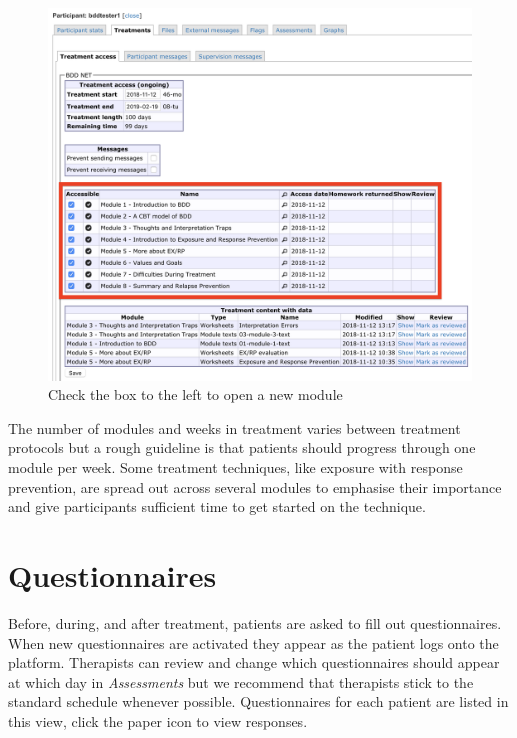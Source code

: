 \documentclass[]{book}
\theoremstyle{definition}
\theoremstyle{definition}
\theoremstyle{definition}
\theoremstyle{remark}
\begin{document}
\begin{figure}
\centering
\includegraphics{images/module-access.png}
\caption{Check the box to the left to open a new module}
\end{figure}

The number of modules and weeks in treatment varies between treatment
protocols but a rough guideline is that patients should progress through
one module per week. Some treatment techniques, like exposure with
response prevention, are spread out across several modules to emphasise
their importance and give participants sufficient time to get started on
the technique.

\hypertarget{questionnaires}{%
\section{Questionnaires}\label{questionnaires}}

Before, during, and after treatment, patients are asked to fill out
questionnaires. When new questionnaires are activated they appear as the
patient logs onto the platform. Therapists can review and change which
questionnaires should appear at which day in \emph{Assessments} but we
recommend that therapists stick to the standard schedule whenever
possible. Questionnaires for each patient are listed in this view, click
the paper icon to view responses.
\end{document}
